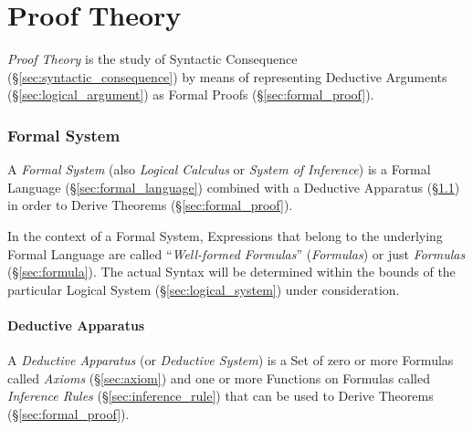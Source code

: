 \part{Proof Theory}\label{sec:proof_theory}

\emph{Proof Theory} is the study of Syntactic Consequence
(\S\ref{sec:syntactic_consequence}) by means of representing Deductive
Arguments (\S\ref{sec:logical_argument}) as Formal Proofs
(\S\ref{sec:formal_proof}).



\section{Formal System}\label{sec:formal_system}

A \emph{Formal System} (also \emph{Logical Calculus} or \emph{System
  of Inference}) is a Formal Language (\S\ref{sec:formal_language})
combined with a Deductive Apparatus (\S\ref{sec:deductive_apparatus})
in order to Derive Theorems (\S\ref{sec:formal_proof}).

In the context of a Formal System, Expressions that belong to the
underlying Formal Language are called ``\emph{Well-formed Formulas}''
(\emph{Formulas}) or just \emph{Formulas} (\S\ref{sec:formula}). The
actual Syntax will be determined within the bounds of the particular
Logical System (\S\ref{sec:logical_system}) under consideration.



\subsection{Deductive Apparatus} \label{sec:deductive_apparatus}

A \emph{Deductive Apparatus} (or \emph{Deductive System}) is a Set of
zero or more Formulas called \emph{Axioms} (\S\ref{sec:axiom}) and one or
more Functions on Formulas called \emph{Inference Rules}
(\S\ref{sec:inference_rule}) that can be used to Derive Theorems
(\S\ref{sec:formal_proof}).

